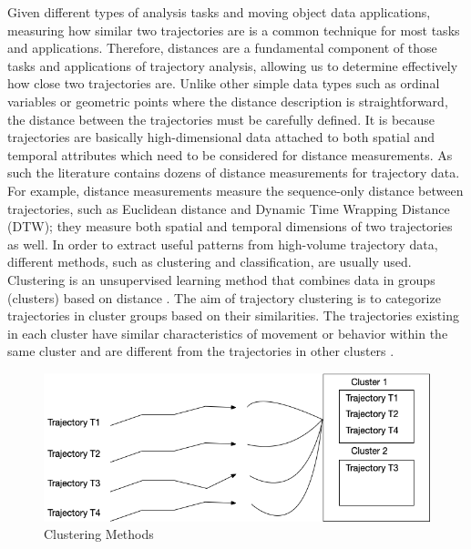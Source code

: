 \documentclass[a4paper, 12pt]{article}
\begin{document}
Given different types of analysis tasks and moving object data applications, measuring how similar two trajectories are is a common technique for most tasks and applications. Therefore, distances are a fundamental component of those tasks and applications of trajectory analysis, allowing us to determine effectively how close two trajectories are. Unlike other simple data types such as ordinal variables or geometric points where the distance description is straightforward, the distance between the trajectories must be carefully defined. It is because trajectories are basically high-dimensional data attached to both spatial and temporal attributes which need to be considered for distance measurements. As such the literature contains dozens of distance measurements for trajectory data. For example, distance measurements measure the sequence-only distance between trajectories, such as Euclidean distance and Dynamic Time Wrapping Distance (DTW); they measure both spatial and temporal dimensions of two trajectories as well.
In order to extract useful patterns from high-volume trajectory data, different methods, such as clustering and classification, are usually used. Clustering is an unsupervised learning method that combines data in groups (clusters) based on distance \citep{han2011data,xu2005survey}. The aim of trajectory clustering is to categorize trajectories in cluster groups based on their similarities. The trajectories existing in each cluster have similar characteristics of movement or behavior within the same cluster and are different from the trajectories in other clusters \citep{berkhin2006survey,besse2015review,yuan2017review}.

\begin{figure}[ht]
    \centering
    \includegraphics[width=1\textwidth]{Cluster Methods.png}
    \caption{Clustering Methods}
    \label{fig2}
\end{figure}
\end{document}
